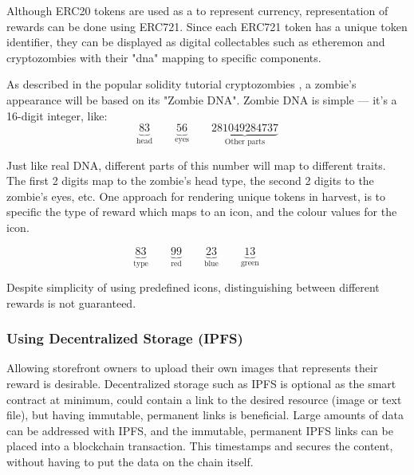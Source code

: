 \documentclass[12pt,tightenlines,letterpaper]{scrartcl}
\begin{document}
Although ERC20 tokens are used as a to represent currency, representation of rewards can be done using ERC721. Since each ERC721 token has a unique token identifier, they can be displayed as digital collectables such as etheremon and cryptozombies \cite{cryptozombies} with their "dna" mapping to specific components.


As described in the popular solidity tutorial cryptozombies \cite{cryptozombies}, a zombie's appearance will be based on its "Zombie DNA". Zombie DNA is simple — it's a 16-digit integer, like:
\[
\underbrace{83}_{\text{head}} \qquad  \underbrace{56}_{\text{eyes}} \qquad \underbrace{281049284737}_{\text{Other parts}}
\]


Just like real DNA, different parts of this number will map to different traits. The first 2 digits map to the zombie's head type, the second 2 digits to the zombie's eyes, etc. One approach for rendering unique tokens in harvest, is to specific the type of reward which maps to an icon, and the colour values for the icon.

\[
\underbrace{83}_{\text{type}} \qquad  \underbrace{99}_{\text{red}} \qquad \underbrace{23}_{\text{blue}} \qquad \underbrace{13}_{\text{green}} \qquad 
\]


Despite simplicity of using predefined icons, distinguishing between different rewards is not guaranteed.

\subsubsection{Using Decentralized Storage (IPFS)}


Allowing storefront owners to upload their own images that represents their reward is desirable. Decentralized storage such as IPFS is optional as the smart contract at minimum, could contain a link to the desired resource (image or text file), but having immutable, permanent links is beneficial. 
 Large amounts of data can be addressed with IPFS, and the immutable, permanent IPFS links can be placed into a blockchain transaction. This timestamps and secures the content, without having to put the data on the chain itself.
\end{document}
